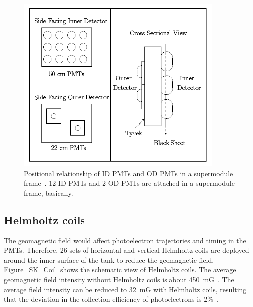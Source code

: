 \begin{figure}[H]
	\centering
	\includegraphics[width=10cm]{Figures/SK/IDODPMT}
	\caption[Positional relationship of ID PMTs and OD PMTs in a supermodule frame]{
	Positional relationship of ID PMTs and OD PMTs in a supermodule frame~\cite{1997ZoaPhD}.
	12 ID PMTs and 2 OD PMTs are attached in a supermodule frame, basically.
	}\label{SK_IDODPMT}
\end{figure}





\subsection{Helmholtz coils}
\vs\hs
The geomagnetic field would affect photoelectron trajectories and timing in the PMTs.
Therefore, 26 sets of horizontal and vertical Helmholtz coils are deployed around the inner surface of the tank to reduce the geomagnetic field.
Figure~\ref{SK_Coil} shows the schematic view of Helmholtz coils.
The average geomagnetic field intensity without Helmholtz coils is about 450~mG~\cite{2003Fukuda}.
The average field intensity can be reduced to 32~mG with Helmholtz coils, resulting that the deviation in the collection efficiency of photoelectrons is 2\%~\cite{2014AbeCalib}.

